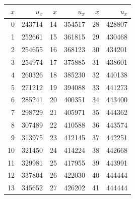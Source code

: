 \begin{tabular}{rr@{\qquad}rr@{\qquad}rr}
\toprule
$x$&$u_x$&$x$&$u_x$&$x$&$u_x$\\
\midrule
0&243714&14&354517&28&428807\\
1&252661&15&361815&29&430468\\
2&254655&16&368123&30&434201\\
3&254974&17&375885&31&438601\\
4&260326&18&385230&32&440138\\
5&271212&19&394088&33&441273\\
6&285241&20&400351&34&443400\\
7&298729&21&405971&35&444362\\
8&307489&22&410588&36&443574\\
9&313975&23&412145&37&442251\\
10&321450&24&414224&38&442668\\
11&329981&25&417955&39&443991\\
12&337804&26&422030&40&444444\\
13&345652&27&426202&41&444444\\
\bottomrule
\end{tabular}
